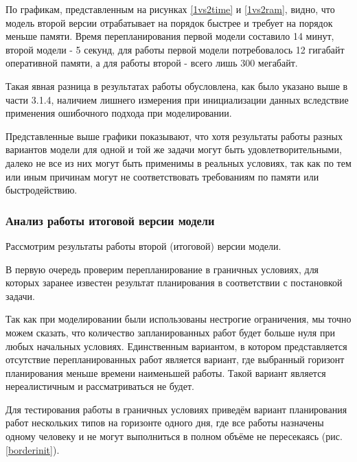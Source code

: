 

По графикам, представленным на рисунках \ref{1vs2time} и \ref{1vs2ram}, видно, что модель второй версии отрабатывает на порядок быстрее и требует на порядок меньше памяти. Время перепланирования первой модели составило 14 минут, второй модели - 5 секунд, для работы первой модели потребовалось 12 гигабайт оперативной памяти, а для работы второй - всего лишь 300 мегабайт.

Такая явная разница в результатах работы обусловлена, как было указано выше в части 3.1.4, наличием лишнего измерения при инициализации данных вследствие применения ошибочного подхода при моделировании.

Представленные выше графики показывают, что хотя результаты работы разных вариантов модели для одной и той же задачи могут быть удовлетворительными, далеко не все из них могут быть применимы в реальных условиях, так как по тем или иным причинам могут не соответствовать требованиям по памяти или быстродействию.

\subsubsection{Анализ работы итоговой версии модели}

Рассмотрим результаты работы второй (итоговой) версии модели.

В первую очередь проверим перепланирование в граничных условиях, для которых заранее известен результат планирования в соответствии с постановкой задачи.

Так как при моделировании были использованы нестрогие ограничения, мы точно можем сказать, что количество запланированных работ будет больше нуля при любых начальных условиях. Единственным вариантом, в котором представляется отсутствие перепланированных работ является вариант, где выбранный горизонт планирования меньше времени наименьшей работы. Такой вариант является нереалистичным и рассматриваться не будет.

Для тестирования работы в граничных условиях приведём вариант планирования работ нескольких типов на горизонте одного дня, где все работы назначены одному человеку и не могут выполниться в полном объёме не пересекаясь (рис. \ref{borderinit}).

